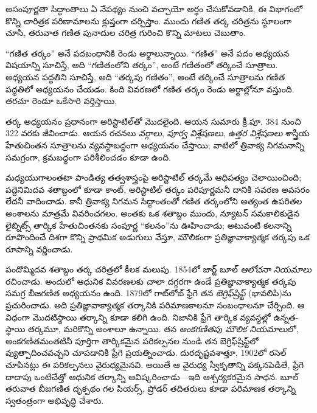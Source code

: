 \documentclass[../../../include/open-logic-section]{subfiles}
\begin{document}


అసంపూర్ణతా సిద్ధాంతాలు ఏ నేపథ్యం నుంచి వచ్చాయో అర్థం చేసుకోవడానికి, ఈ
విభాగంలో కొన్ని చారిత్రక పరిణామాలను క్లుప్తంగా చర్చిస్తాం. ముందు గణిత
తర్క చరిత్రను స్థూలంగా చూసి, తరువాత గణిత పునాదుల చరిత్ర గురించి కొన్ని
మాటలు చెబుతాం.

\begin{digress}
  ``గణిత తర్కం'' అనే పదబంధానికి రెండు అర్థాలున్నాయి. ``గణిత'' అనే పదం
  అధ్యయన విషయాన్ని సూచిస్తే, అది ``గణితంలోని తర్కం'', అంటే గణితంలో తర్కించే
  సూత్రాలు. అధ్యయన పద్ధతిని సూచిస్తే, అది ``తర్కపు గణితం'', అంటే తర్కించే
  సూత్రాలను గణిత పద్ధతిలో అధ్యయనం చేయడం. కింది వివరణలో గణిత తర్కం రెండు
  అర్థాల్లోనూ వస్తుంది. తరచూ రెండూ ఒకేసారి వర్తిస్తాయి.
\end{digress}

తర్క అధ్యయనం ప్రధానంగా అరిస్టాటిల్‌తో మొదలైంది.
ఆయన సుమారు క్రీ.పూ. 384 నుంచి 322 వరకు జీవించాడు. ఆయన రచనలు \emph{వర్గాలు}, \emph{పూర్వ విశ్లేషణలు},
\emph{ఉత్తర విశ్లేషణలు} శాస్త్రీయ హేతుచింతన సూత్రాలను వ్యవస్థాబద్ధంగా
అధ్యయనం చేస్తాయి; వాటిలో త్రివాక్య నిగమనాన్ని సమగ్రంగా, క్రమబద్ధంగా పరిశీలించడం
కూడా ఉంది.

మధ్యయుగాలంతటా పాండిత్య తత్వశాస్త్రంపై అరిస్టాటిల్ తర్కమే ఆధిపత్యం చెలాయించింది;
పద్దెనిమిదవ శతాబ్దంలో కూడా కాంట్, అరిస్టాటిల్ తర్కం పరిపూర్ణమనీ దానికి సవరణ
అవసరం లేదనీ వాదించాడు. కానీ త్రివాక్య నిగమన సిద్ధాంతంతో గణిత తర్కంలోని అత్యంత
ఉపరితల అంశాలను మాత్రమే వివరించగలం. అంతకు ఒక శతాబ్దం ముందు,
న్యూటన్ సమకాలికుడైన లైబ్నిట్స్ తార్కిక హేతుచింతనకు సంపూర్ణ ``కలనం''ను
ఊహించాడు; అటువంటి కలనాన్ని రూపొందించే దిశగా కొన్ని ప్రాథమిక అడుగులు వేస్తూ,
మౌలికంగా ప్రతిజ్ఞావాక్యాత్మక తర్కపు ఒక రూపాన్ని వర్ణించాడు.

పందొమ్మిదవ శతాబ్దం తర్క చరిత్రలో కీలక మలుపు. 1854లో జార్జ్ బూల్
\emph{ఆలోచనా నియమాలు} రచించాడు. అందులో ఆధునిక వివరణలకు చాలా దగ్గరగా ఉండే
ప్రతిజ్ఞావాక్యాత్మక తర్కపు సమగ్ర బీజగణిత అధ్యయనం ఉంది. 1879లో గాట్‌లోబ్ ఫ్రేగె
తన \emph{బెగ్రిఫ్‌ష్రిఫ్ట్} (భావలిపి)ను ప్రచురించాడు. అది ప్రతిజ్ఞావాక్యాత్మక
తర్కానికి పరిమాణకాలనూ సంబంధాలనూ చేర్చింది. ఆ విధంగా మొదటిస్థాయి తర్కాన్ని
కూడా కలిగి ఉంది.
నిజానికి ఫ్రేగె తార్కిక వ్యవస్థల్లో ఉన్నత-స్థాయి తర్కమూ, మరికొన్ని అంశాలూ ఉన్నాయి.
తన \emph{అంకగణితపు మౌలిక నియమాలు}లో, అంకగణితమంతటినీ పూర్తిగా తార్కికమైన
పరికల్పనల నుండి తన బెగ్రిఫ్‌ష్రిఫ్ట్‌లో వ్యుత్పాదించవచ్చని చూపడానికి ఫ్రేగె
ప్రయత్నించాడు. దురదృష్టవశాత్తూ, 1902లో రసెల్ చూపినట్లు ఈ పరికల్పనలు వైరుధ్యమైనవి.
అయితే ఆ వైరుధ్య స్వీకృతాన్ని పక్కనపెడితే, ఫ్రేగె దాదాపు ఒంటిచేత్తో ఆధునిక తర్కాన్ని
ఆవిష్కరించాడు---ఇది ఆశ్చర్యకరమైన సాధన. బూల్ తరువాత బీజగణిత దృక్పథం గల పియర్స్,
ష్రోడర్ తదితరులు కూడా పరిమాణక తర్కాన్ని స్వతంత్రంగా అభివృద్ధి చేశారు.
\end{document}
